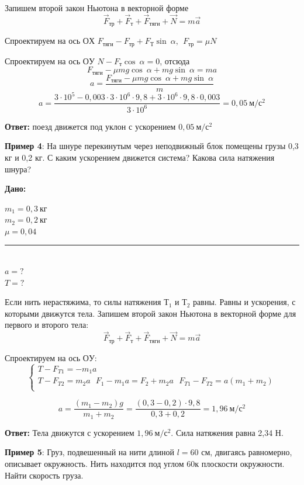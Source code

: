 \documentclass[a5paper, 10pt]{diss_4}
\renewcommand{\'}{\,'}
\begin{document}
Запишем второй закон Ньютона в векторной форме
\[
\vec{F}_{тр}+\vec{F}_{т}+\vec{F}_{тяги}+\vec{N}=m\vec{a}
\]

Спроектируем на ось $ОХ$
$F_{тяги} - F_{тр}+F_Т \sin\ \alpha,\ \ F_{тр}=\mu N$

Спроектируем на ось $ОУ$
$N-F_т\cos\ \alpha=0$, отсюда
\[
F_{тяги}-\mu mg\cos\ \alpha+mg\sin\ \alpha=ma
\]
\[
a=\frac{F_{тяги}-\mu mg\cos\ \alpha+mg\sin\ \alpha}{m}
\]
\[
a=\frac{3\cdot 10^{5} -0,003\cdot 3\cdot 10^{6} \cdot 9,8+3\cdot 10^{6} \cdot 9,8\cdot 0,003}{3\cdot 10^{6} } =0,05\ м/с^{2}
\]

\textbf{Ответ:} поезд движется под уклон с ускорением $0,05\ м/с^{2}$

\textbf{Пример 4}: На шнуре перекинутым через неподвижный блок помещены грузы 0,3 кг и 0,2 кг. С каким ускорением движется система? Какова сила натяжения шнура?

\hspace{1cm}\textbf{Дано:}\hspace{.3cm}
\parbox[t]{4cm}{
$m_1 = 0,3\ кг$\\
$m_2 = 0,2\ кг$\\
$\mu = 0,04$\\
\rule{4cm}{.4pt}\\
$a = ?$\\
$T = ?$\\
}

Если нить нерастяжима, то силы натяжения $Т_1$ и $Т_2$ равны. Равны и ускорения, с которыми движутся тела. Запишем второй закон Ньютона в векторной форме для первого и второго тела:
\[
\vec{F}_{тр}+\vec{F}_{т}+\vec{F}_{тяги}+\vec{N}=m\vec{a}
\]

Спроектируем на ось $ОУ$:
\begin{equation*}
     \left\{
          \begin{array}{lr}
 T-F_{T1}=-m_1a\\
 T-F_{T2}= m_2a\ \ \ F_1-m_1a=F_2+m_2a\ \ \ F_{T1}-F_{T2}=a(m_1+m_2)\\
          \end{array}
     \right.
\end{equation*}

\[
a=\frac{\left(m_{{1}} -{m}_{{2}} \right){g}}{{m}_{{1}} +{m}_{{2}} } =\frac{\left(0,3-0,2\right)\cdot 9,8}{0,3+0,2} ={1,96}\ м/с^2
\]

\textbf{Ответ:} Тела движутся с ускорением ${1,96}\ м/с^2$. Сила натяжения равна 2,34 Н.

\textbf{Пример 5}: Груз, подвешенный на нити длиной $l=60$ см, двигаясь равномерно, описывает окружность. Нить находится под углом 60\textdegree к плоскости окружности. Найти скорость груза.
\end{document}
